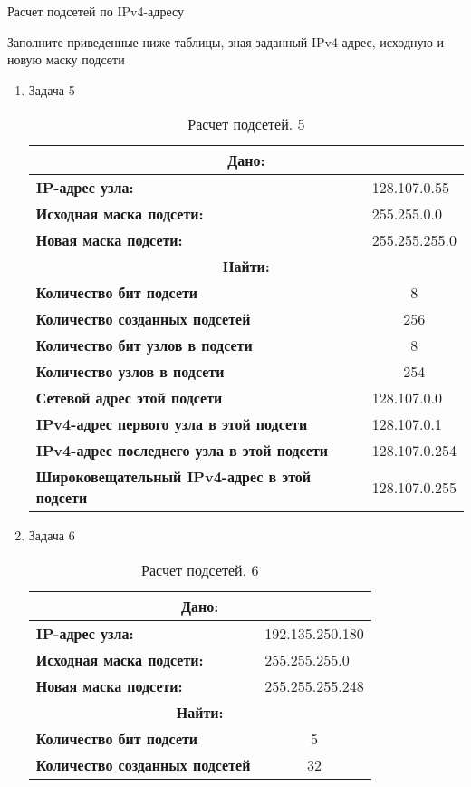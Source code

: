 \documentclass[a4paper,14pt]{extarticle}
\begin{document}
\begin{mypart}{Расчет подсетей по IPv4-адресу}
\begin{step}{Заполните приведенные ниже таблицы, зная заданный IPv4-адрес, исходную и
			новую маску подсети}
\begin{enumerate}
\item Задача 5
\begin{table}[h!]
	\centering
	\caption{Расчет подсетей. 5}
	\begin{tabular}{|l|l|}
		\hline
			\multicolumn{2}{|c|}{\textbf{Дано:}}  \\ \hline
		\textbf{IP-адрес узла:} & 128.107.0.55 \\ \hline
		\textbf{Исходная маска подсети:} & 255.255.0.0 \\ \hline
		\textbf{Новая маска подсети:} & 255.255.255.0 \\ \hline
			\multicolumn{2}{|c|}{\textbf{Найти:}}  \\ \hline
		\textbf{Количество бит подсети} & \multicolumn{1}{c|}{8} \\ \hline
		\textbf{Количество созданных подсетей} & \multicolumn{1}{c|}{256} \\ \hline
		\textbf{Количество бит узлов в подсети} & \multicolumn{1}{c|}{8} \\ \hline
		\textbf{Количество узлов в подсети} & \multicolumn{1}{c|}{254} \\ \hline
		\textbf{Сетевой адрес этой подсети} & 128.107.0.0 \\ \hline
		\textbf{IPv4-адрес первого узла в этой подсети} & 128.107.0.1 \\ \hline
		\textbf{IPv4-адрес последнего узла в этой подсети} & 128.107.0.254 \\ \hline
		\textbf{Широковещательный IPv4-адрес в этой подсети} & 128.107.0.255 \\ \hline
	\end{tabular}
	\label{}
\end{table}
\newpage
\item Задача 6
\begin{table}[h]
	\centering
	\caption{Расчет подсетей. 6}
	\begin{tabular}{|l|l|}
		\hline
			\multicolumn{2}{|c|}{\textbf{Дано:}}  \\ \hline
		\textbf{IP-адрес узла:} & 192.135.250.180 \\ \hline
		\textbf{Исходная маска подсети:} & 255.255.255.0 \\ \hline
		\textbf{Новая маска подсети:} & 255.255.255.248 \\ \hline
			\multicolumn{2}{|c|}{\textbf{Найти:}}  \\ \hline
		\textbf{Количество бит подсети} & \multicolumn{1}{c|}{5} \\ \hline
		\textbf{Количество созданных подсетей} & \multicolumn{1}{c|}{32} \\ \hline

\end{tabular}
\end{table}
\end{enumerate}
\end{step}
\end{mypart}
\end{document}
